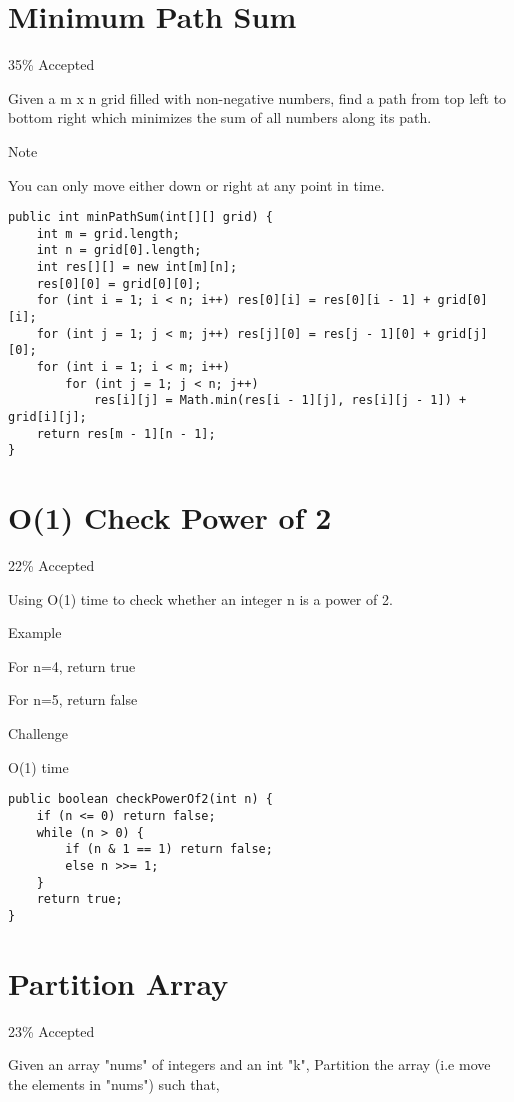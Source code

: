 \documentclass[12pt]{book}
\begin{document}
\chapter{Minimum Path Sum}
\label{sec-45}

35\% Accepted

Given a m x n grid filled with non-negative numbers, find a path from top left to bottom right which minimizes the sum of all numbers along its path.

Note

You can only move either down or right at any point in time.
\lstset{language=java,label= ,caption= ,numbers=none}
\begin{lstlisting}
public int minPathSum(int[][] grid) {
    int m = grid.length;
    int n = grid[0].length;
    int res[][] = new int[m][n];
    res[0][0] = grid[0][0];
    for (int i = 1; i < n; i++) res[0][i] = res[0][i - 1] + grid[0][i];
    for (int j = 1; j < m; j++) res[j][0] = res[j - 1][0] + grid[j][0];
    for (int i = 1; i < m; i++) 
        for (int j = 1; j < n; j++) 
            res[i][j] = Math.min(res[i - 1][j], res[i][j - 1]) + grid[i][j];
    return res[m - 1][n - 1];
}
\end{lstlisting}
\chapter{O(1) Check Power of 2}
\label{sec-46}

22\% Accepted

Using O(1) time to check whether an integer n is a power of 2.

Example

For n=4, return true

For n=5, return false

Challenge

O(1) time
\lstset{language=java,label= ,caption= ,numbers=none}
\begin{lstlisting}
public boolean checkPowerOf2(int n) {
    if (n <= 0) return false;
    while (n > 0) {
        if (n & 1 == 1) return false;
        else n >>= 1;
    }
    return true;
}
\end{lstlisting}
\chapter{Partition Array}
\label{sec-47}

23\% Accepted

Given an array "nums" of integers and an int "k", Partition the array (i.e move the elements in "nums") such that,
\end{document}
